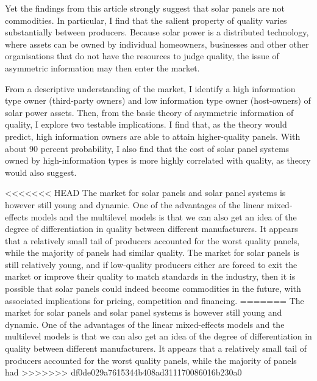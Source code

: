 \documentclass[12pt]{article}
\begin{document}
 Yet the findings from this article strongly suggest that solar panels are not commodities. In particular, I find that the salient property of quality varies substantially between producers. Because solar power is a distributed technology, where assets can be owned by individual homeowners, businesses and other other organisations that do not have the resources to judge quality, the issue of asymmetric information may then enter the market.

 From a descriptive understanding of the market, I identify a high information type owner (third-party owners) and low information type owner (host-owners) of solar power assets. Then, from the basic theory of asymmetric information of quality, I explore two testable implications. I find that, as the theory would predict, high information owners are able to attain higher-quality panels. With about 90 percent probability, I also find that the cost of solar panel systems owned by high-information types is more highly correlated with quality, as theory would also suggest.

<<<<<<< HEAD
 The market for solar panels and solar panel systems is however still young and dynamic. One of the advantages of the linear mixed-effects models and the multilevel models is that we can also get an idea of the degree of differentiation in quality between different manufacturers. It appears that a relatively small tail of producers accounted for the worst quality panels, while the majority of panels had similar quality. The market for solar panels is still relatively young, and if low-quality producers either are forced to exit the market or improve their quality to match standards in the industry, then it is possible that solar panels could indeed become commodities in the future, with associated implications for pricing, competition and financing.
=======
 The market for solar panels and solar panel systems is however still young and dynamic. One of the advantages of the linear mixed-effects models and the multilevel models is that we can also get an idea of the degree of differentiation in quality between different manufacturers. It appears that a relatively small tail of producers accounted for the worst quality panels, while the majority of panels had 
>>>>>>> df0de029a7615344b408ad311170086016b230a0

\begin{spacing}{1}






\end{spacing}
\end{document}
